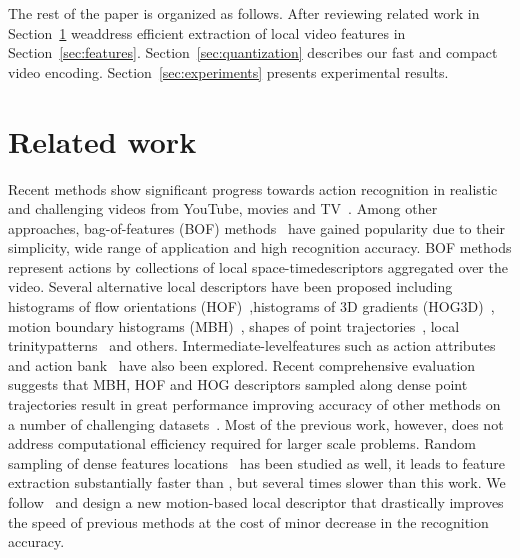 \documentclass[10pt,twocolumn,letterpaper]{article}
\begin{document}
The rest of the paper is organized as follows. 
After reviewing related work in Section~\ref{sec:relatedwork} weaddress efficient extraction of local video features in
Section~\ref{sec:features}. Section~\ref{sec:quantization}
describes our fast and compact video encoding.
Section~\ref{sec:experiments} presents experimental results.

\section{Related work}
\label{sec:relatedwork}
Recent methods show significant progress towards action
recognition in realistic and challenging videos from YouTube,
movies and
TV~\cite{Laptev08,Laptev07,Liu11,Niebles10,Rodriguez08,Sadanand12,Wang12}.
Among other approaches, bag-of-features (BOF)
methods~\cite{Dollar05,Laptev05,Schuldt04} have gained
popularity due to their simplicity, wide range of application
and high recognition accuracy.
BOF methods represent actions by collections of local space-timedescriptors aggregated over the video.
Several alternative local descriptors have been proposed
including histograms of flow orientations (HOF)~\cite{Laptev08},histograms of 3D gradients
(HOG3D)~\cite{klaser2008spatio,Scovanner07}, motion boundary
histograms (MBH)~\cite{Dalal06,Wang12}, shapes of point
trajectories~\cite{Matikainen09,Messing09,Wang12}, local trinitypatterns~\cite{Kliper12,Yeffet09} and others. Intermediate-levelfeatures such as action attributes~\cite{Liu11} and action
bank~\cite{Sadanand12} have also been explored. Recent
comprehensive evaluation~\cite{Wang12} suggests that MBH, HOF
and HOG descriptors sampled along dense point trajectories
result in great performance improving accuracy of other
methods on a number of challenging datasets~\cite{Wang12}. Most
of the previous work, however, does not address computational
efficiency required for larger scale problems. Random sampling
of dense features locations~\cite{Feng13} has been studied as
well, it leads to feature extraction substantially faster than
\cite{Wang12}, but several times slower than this work. We
follow~\cite{Wang12} and design a new motion-based local
descriptor that drastically improves the speed of previous
methods at the cost of minor decrease in the recognition
accuracy.
\end{document}
